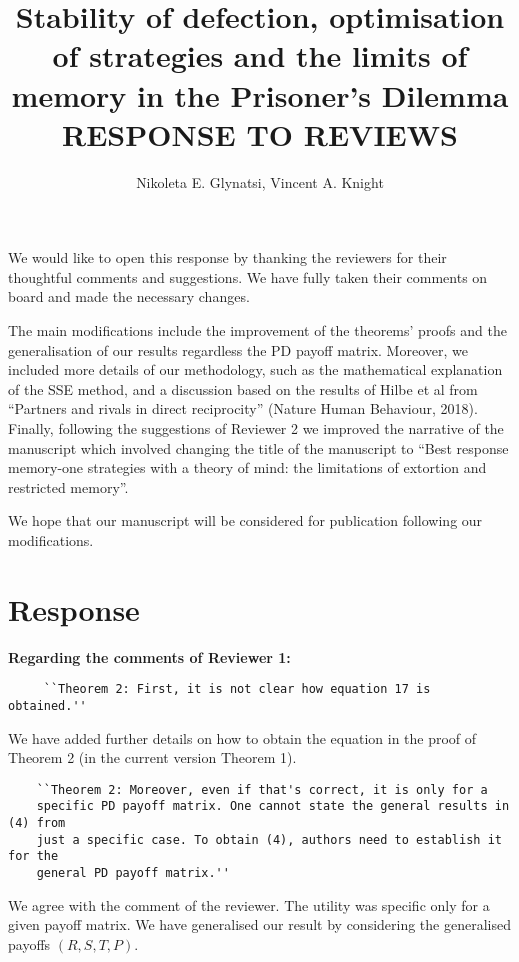 \documentclass{article}
\title{Stability of defection, optimisation of strategies and the limits of
memory in the Prisoner's Dilemma RESPONSE TO REVIEWS}
\author{Nikoleta E. Glynatsi, Vincent A. Knight}
\begin{document}
\maketitle

We would like to open this response by thanking the reviewers for their
thoughtful comments and suggestions. We have fully taken their comments on board
and made the necessary changes.

The main modifications include the improvement of the theorems' proofs and the
generalisation of our results regardless the PD payoff matrix. Moreover, we
included more details of our methodology, such as the mathematical explanation
of the SSE method, and a discussion based on the results of Hilbe et al from
``Partners and rivals in direct reciprocity'' (Nature Human Behaviour, 2018).
Finally, following the suggestions of Reviewer 2 we improved the narrative of
the manuscript which involved changing the title of the manuscript to 
``Best response memory-one strategies with a theory of mind: the limitations
of extortion and restricted memory''.

We hope that our manuscript will be considered for publication following our
modifications.

\section{Response}

\textbf{Regarding the comments of Reviewer 1:}

\begin{verbatim}
     ``Theorem 2: First, it is not clear how equation 17 is obtained.''
\end{verbatim}

We have added further details on how to obtain the equation in the proof of Theorem 2
(in the current version Theorem 1).

\begin{verbatim}
    ``Theorem 2: Moreover, even if that's correct, it is only for a
    specific PD payoff matrix. One cannot state the general results in (4) from
    just a specific case. To obtain (4), authors need to establish it for the
    general PD payoff matrix.''
\end{verbatim}

We agree with the comment of the reviewer. The utility was
specific only for a given payoff matrix. We have generalised our result by
considering the generalised payoffs \((R, S, T, P)\).
\end{document}
